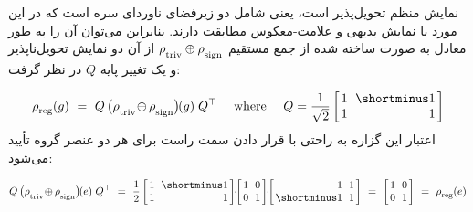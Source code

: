 نمایش منظم تحویل‌پذیر است، یعنی شامل دو زیرفضای ناوردای سره است که در این مورد با نمایش بدیهی و علامت-معکوس مطابقت دارند.
بنابراین می‌توان آن را به طور معادل به صورت ساخته شده از جمع مستقیم $\rho_{\overset{}{\textup{triv}}} \oplus \rho_{\overset{}{\textup{sign}}}$ از آن دو نمایش تحویل‌ناپذیر و یک تغییر پایه $Q$ در نظر گرفت:

\begin{align}\label{eq:rho_reg_decomposition}
	\rhoreg(g)\ =\ Q\, \big( \rhotriv \!\oplus\mkern-1mu \rhosign \big)\mkern-2mu(g)\; Q^\top
	\quad\ \textup{where } \quad
	Q = \frac{1}{\sqrt{2}}
	\begin{bmatrix} \hspace{1.5pt}
		1 &\mkern-7mu \shortminus1 \hspace*{1.5pt} \\ \hspace{1.5pt} 1 &\mkern-7mu \phantom{\shortminus}1 \hspace*{1.5pt}
	\end{bmatrix}
\end{align}
اعتبار این گزاره به راحتی با قرار دادن سمت راست برای هر دو عنصر گروه تأیید می‌شود:

\begin{align}
	Q\, \big( \rhotriv \!\oplus\mkern-1mu \rhosign \big)\mkern-2mu(e)\; Q^\top
	\ =\ \frac{1}{2}
	\begin{bmatrix} \hspace{1.5pt}
		1 &\mkern-7mu \shortminus1 \hspace*{1.5pt} \\ \hspace{1.5pt} 1 &\mkern-7mu \phantom{\shortminus}1 \hspace*{1.5pt}
	\end{bmatrix} \mkern-6mu \cdot\mkern-6mu
	\begin{bmatrix} \hspace{1.5pt}
		1 &\mkern-7mu 0 \hspace*{1.5pt} \\ \hspace{1.5pt} 0 &\mkern-7mu 1 \hspace*{1.5pt}
	\end{bmatrix} \mkern-6mu \cdot\mkern-6mu
	\begin{bmatrix} \hspace{1.5pt}
		\phantom{\shortminus}1 &\mkern-7mu 1 \hspace*{1.5pt} \\ \hspace{1.5pt} \shortminus1 &\mkern-7mu 1 \hspace*{1.5pt}
	\end{bmatrix}
	\ =\ 
	\begin{bmatrix} \hspace{1.5pt}
		1 &\mkern-7mu 0 \hspace*{1.5pt} \\ \hspace{1.5pt} 0 &\mkern-7mu 1 \hspace*{1.5pt}
	\end{bmatrix}
	\ =\ \rhoreg(e)
\end{align}

